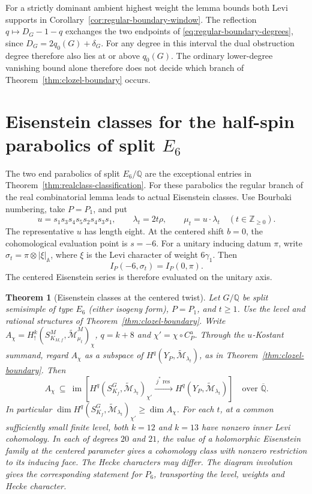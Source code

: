 \documentclass[12pt]{amsart}
\numberwithin{equation}{section}
\theoremstyle{plain}
\newtheorem{theorem}{Theorem}[section]
\theoremstyle{definition}
\theoremstyle{remark}
\newcommand{\Q}{\mathbb Q}
\newcommand{\Z}{\mathbb{Z}}
\newcommand{\tcM}{\widetilde{\mathcal M}}
\begin{document}
For a strictly dominant ambient highest weight the lemma bounds both Levi supports in Corollary~\ref{cor:regular-boundary-window}. The reflection $q\mapsto D_G-1-q$ exchanges the two endpoints of \eqref{eq:regular-boundary-degrees}, since $D_G=2q_0(G)+\delta_G$. For any degree in this interval the dual obstruction degree therefore also lies at or above $q_0(G)$. The ordinary lower-degree vanishing bound alone therefore does not decide which branch of Theorem~\ref{thm:clozel-boundary} occurs.

\section{Eisenstein classes for the half-spin parabolics of split \texorpdfstring{$E_6$}{E6}}\label{sec:realclass-E6}

The two end parabolics of split $E_6/\Q$ are the exceptional entries in Theorem~\ref{thm:realclass-classification}. For these parabolics the regular branch of the real combinatorial lemma leads to actual Eisenstein classes. Use Bourbaki numbering, take $P=P_1$, and put
\[
 u=s_1s_3s_4s_5s_2s_4s_3s_1,\qquad
 \lambda_t=2t\rho,\qquad \mu_t=u\cdot\lambda_t
 \quad(t\in\Z_{\ge0}).
\]
The representative $u$ has length eight. At the centered shift $b=0$, the cohomological evaluation point is $s=-6$. For a unitary inducing datum $\pi$, write $\sigma_t=\pi\otimes|\xi|_{\mathbb A}$, where $\xi$ is the Levi character of weight $6\gamma_1$. Then
\[
 I_P(-6,\sigma_t)=I_P(0,\pi).
\]
The centered Eisenstein series is therefore evaluated on the unitary axis.

\begin{theorem}[Eisenstein classes at the centered twist] \label{thm:E6-ordinary}
Let $G/\Q$ be split semisimple of type $E_6$ (either isogeny form), $P=P_1$, and $t\ge1$. Use the level and rational structures of Theorem~\ref{thm:clozel-boundary}. Write $A_\chi= H_!^k(S^M_{K_{M,f}},\tcM_{\mu_t}^M)_\chi$, $q=k+8$ and $\chi'=\chi\circ C_P^{\mathrm a}$. Through the $u$-Kostant summand, regard $A_\chi$ as a subspace of $H^q(Y_P,\tcM_{\lambda_t})$, as in Theorem~\ref{thm:clozel-boundary}. Then
\begin{equation}\label{eq:E6-face-image}
 A_\chi\ \subseteq\
 \operatorname{im}\!\left[H^q(S^G_{K_f},\tcM_{\lambda_t})_{\chi'}
         \xrightarrow{\ j^*\operatorname{res}\ }H^q(Y_P,\tcM_{\lambda_t})\right]
 \quad\text{over }\overline{\Q}.
\end{equation}
In particular $\dim H^q(S^G_{K_f},\tcM_{\lambda_t})_{\chi'}\ge\dim A_\chi$. For each $t$, at a common sufficiently small finite level, both $k=12$ and $k=13$ have nonzero inner Levi cohomology. In each of degrees $20$ and $21$, the value of a holomorphic Eisenstein family at the centered parameter gives a cohomology class with nonzero restriction to its inducing face. The Hecke characters may differ. The diagram involution gives the corresponding statement for $P_6$, transporting the level, weights and Hecke character.
\end{theorem}
\end{document}
